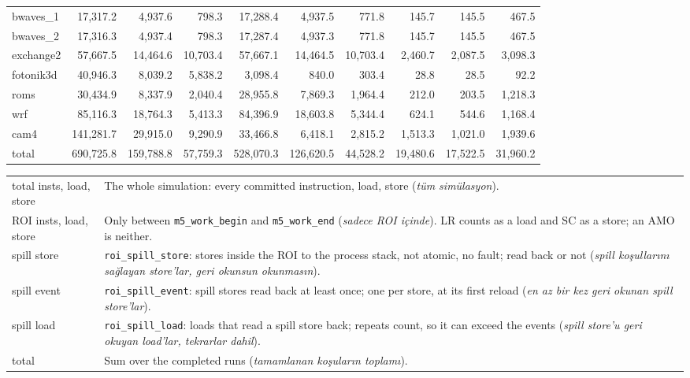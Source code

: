 \documentclass[10pt,a4paper]{article}
\newcommand{\ct}[1]{\texttt{#1}}
\renewcommand{\arraystretch}{1.2}
\begin{document}
{\begin{longtable}{@{}lrrrrrrrrr@{}}
bwaves\_1 & 17,317.2 & 4,937.6 & 798.3 & 17,288.4 & 4,937.5 & 771.8 & 145.7 & 145.5 & 467.5 \\
bwaves\_2 & 17,316.3 & 4,937.4 & 798.3 & 17,287.4 & 4,937.3 & 771.8 & 145.7 & 145.5 & 467.5 \\
exchange2 & 57,667.5 & 14,464.6 & 10,703.4 & 57,667.1 & 14,464.5 & 10,703.4 & 2,460.7 & 2,087.5 & 3,098.3 \\
fotonik3d & 40,946.3 & 8,039.2 & 5,838.2 & 3,098.4 & 840.0 & 303.4 & 28.8 & 28.5 & 92.2 \\
roms & 30,434.9 & 8,337.9 & 2,040.4 & 28,955.8 & 7,869.3 & 1,964.4 & 212.0 & 203.5 & 1,218.3 \\
wrf & 85,116.3 & 18,764.3 & 5,413.3 & 84,396.9 & 18,603.8 & 5,344.4 & 624.1 & 544.6 & 1,168.4 \\
cam4 & 141,281.7 & 29,915.0 & 9,290.9 & 33,466.8 & 6,418.1 & 2,815.2 & 1,513.3 & 1,021.0 & 1,939.6 \\
\midrule
total & 690,725.8 & 159,788.8 & 57,759.3 & 528,070.3 & 126,620.5 & 44,528.2 & 19,480.6 & 17,522.5 & 31,960.2 \\
\end{longtable}
}
{\footnotesize\renewcommand{\arraystretch}{1.0}
\begin{tabularx}{\textwidth}{@{}>{\raggedright\arraybackslash}p{27mm} >{\raggedright\arraybackslash}X@{}}
total insts, load, store & The whole simulation: every committed instruction, load, store (\textit{t\"um sim\"ulasyon}). \\
ROI insts, load, store & Only between \ct{m5\_work\_begin} and \ct{m5\_work\_end} (\textit{sadece ROI i\c{c}inde}). LR counts as a load and SC as a store; an AMO is neither. \\
spill store & \ct{roi\_spill\_store}: stores inside the ROI to the process stack, not atomic, no fault; read back or not (\textit{spill ko\c{s}ullar{\i}n{\i} sa\u{g}layan store'lar, geri okunsun okunmas{\i}n}). \\
spill event & \ct{roi\_spill\_event}: spill stores read back at least once; one per store, at its first reload (\textit{en az bir kez geri okunan spill store'lar}). \\
spill load & \ct{roi\_spill\_load}: loads that read a spill store back; repeats count, so it can exceed the events (\textit{spill store'u geri okuyan load'lar, tekrarlar dahil}). \\
total & Sum over the completed runs (\textit{tamamlanan ko\c{s}ular{\i}n toplam{\i}}). \\
\end{tabularx}\par}
\end{document}

